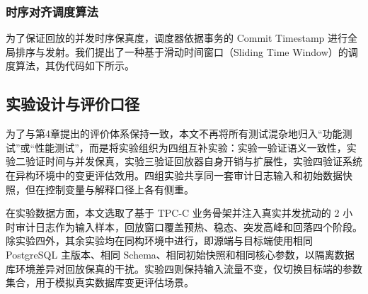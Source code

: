\subsubsection{时序对齐调度算法}
为了保证回放的并发时序保真度，调度器依据事务的 Commit Timestamp 进行全局排序与发射。我们提出了一种基于滑动时间窗口（Sliding Time Window）的调度算法，其伪代码如下所示。


\subsection{实验设计与评价口径}
为了与第4章提出的评价体系保持一致，本文不再将所有测试混杂地归入“功能测试”或“性能测试”，而是将实验组织为四组互补实验：实验一验证语义一致性，实验二验证时间与并发保真，实验三验证回放器自身开销与扩展性，实验四验证系统在异构环境中的变更评估效用。四组实验共享同一套审计日志输入和初始数据快照，但在控制变量与解释口径上各有侧重。

在实验数据方面，本文选取了基于 TPC-C\cite{TPC-C} 业务骨架并注入真实并发扰动的 2 小时审计日志作为输入样本，回放窗口覆盖预热、稳态、突发高峰和回落四个阶段。除实验四外，其余实验均在同构环境中进行，即源端与目标端使用相同 PostgreSQL 主版本、相同 Schema、相同初始快照和相同核心参数，以隔离数据库环境差异对回放保真的干扰。实验四则保持输入流量不变，仅切换目标端的参数集合，用于模拟真实数据库变更评估场景。

